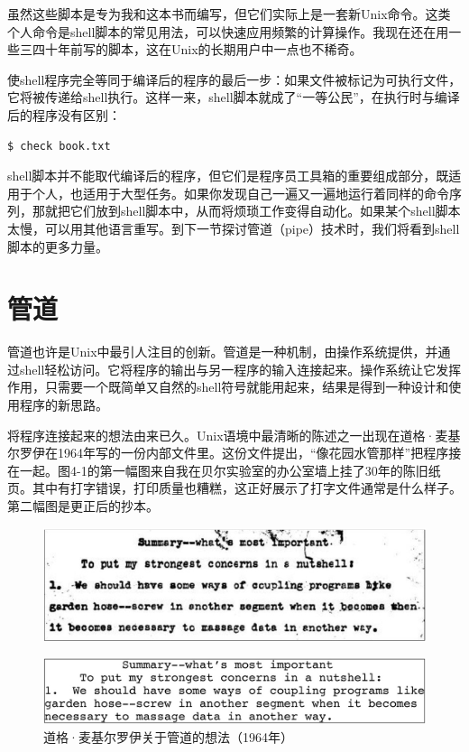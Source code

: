 \documentclass[a4paper,12pt,UTF8,twoside]{ctexbook}
\begin{document}
虽然这些脚本是专为我和这本书而编写，但它们实际上是一套新Unix命令。这类个人命令是shell脚本的常见用法，可以快速应用频繁的计算操作。我现在还在用一些三四十年前写的脚本，这在Unix的长期用户中一点也不稀奇。

使shell程序完全等同于编译后的程序的最后一步：如果文件被标记为可执行文件，它将被传递给shell执行。这样一来，shell脚本就成了“一等公民”，在执行时与编译后的程序没有区别：

\begin{lstlisting}
$ check book.txt
\end{lstlisting}

shell脚本并不能取代编译后的程序，但它们是程序员工具箱的重要组成部分，既适用于个人，也适用于大型任务。如果你发现自己一遍又一遍地运行着同样的命令序列，那就把它们放到shell脚本中，从而将烦琐工作变得自动化。如果某个shell脚本太慢，可以用其他语言重写。到下一节探讨管道（pipe）技术时，我们将看到shell脚本的更多力量。

\section{管道}

管道也许是Unix中最引人注目的创新。管道是一种机制，由操作系统提供，并通过shell轻松访问。它将程序的输出与另一程序的输入连接起来。操作系统让它发挥作用，只需要一个既简单又自然的shell符号就能用起来，结果是得到一种设计和使用程序的新思路。

将程序连接起来的想法由来已久。Unix语境中最清晰的陈述之一出现在道格·麦基尔罗伊在1964年写的一份内部文件里。这份文件提出，“像花园水管那样”把程序接在一起。图4-1的第一幅图来自我在贝尔实验室的办公室墙上挂了30年的陈旧纸页。其中有打字错误，打印质量也糟糕，这正好展示了打字文件通常是什么样子。第二幅图是更正后的抄本。

\begin{figure}[htbp]
	\centering
	\includegraphics[width=0.7\linewidth]{33}
	\caption{}
	\label{fig:1}
\end{figure}

\begin{figure}[htbp]
	\centering
	\includegraphics[width=0.7\linewidth]{34}
	\caption{道格·麦基尔罗伊关于管道的想法（1964年）}
	\label{fig:1}
\end{figure}
\end{document}
